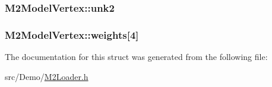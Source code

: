 \hypertarget{struct_m2_model_vertex_ac1bf2fe4905d2e48bc1da6e852ce25cc}{
\subsubsection[{unk2}]{ M2\+Model\+Vertex\+::unk2}}\label{struct_m2_model_vertex_ac1bf2fe4905d2e48bc1da6e852ce25cc}
\hypertarget{struct_m2_model_vertex_a2bf778cfb1cfab90767c316884354d89}{
\subsubsection[{weights}]{ M2\+Model\+Vertex\+::weights\mbox{[}4\mbox{]}}}\label{struct_m2_model_vertex_a2bf778cfb1cfab90767c316884354d89}


The documentation for this struct was generated from the following file\+:\begin{DoxyCompactItemize}
\item 
src/\+Demo/\hyperlink{_m2_loader_8h}{M2\+Loader.\+h}\end{DoxyCompactItemize}
